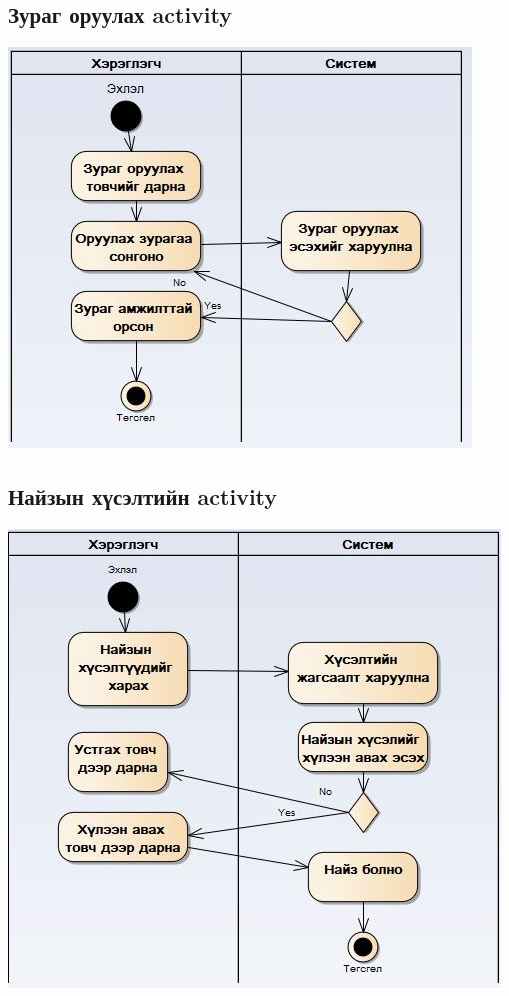 \documentclass[]{article}
\begin{document}
\subsection{Зураг оруулах activity}
\includegraphics[width=\textwidth]{activity1}
\subsection{Найзын хүсэлтийн activity}
\includegraphics[width=\textwidth]{activity2}
\end{document}
